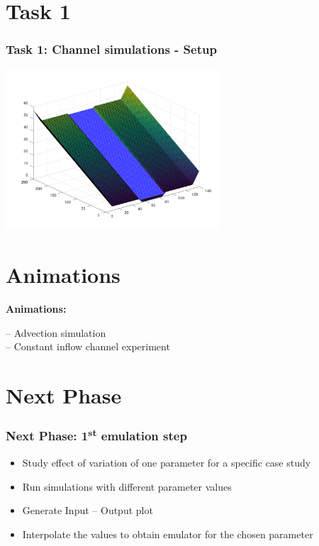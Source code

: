 \documentclass[xcolor=dvipsnames, USenglish]{beamer}  %
\begin{document}

\section{Task 1}

  \begin{frame}
    \frametitle{Task 1: Channel simulations - Setup}
    \centering
    \includegraphics[width=0.6\textwidth]{img/simulation-setup.png}
  \end{frame}


\section{Animations}
  {
    \begin{frame}[plain]
      \centering
      \Large{\textbf{Animations:}}\\
      \begin{flushleft}
        \Large{-- Advection simulation}\\
        \Large{-- Constant inflow channel experiment}
      \end{flushleft}
    \end{frame}
  }


\section{Next Phase}

  \begin{frame}
    \frametitle{Next Phase: 1\textsuperscript{st} emulation step}
    \begin{itemize}
      \item Study effect of variation of one parameter for a specific case study
      \item Run simulations with different parameter values
      \item Generate Input -- Output plot
      \item Interpolate the values to obtain emulator for the chosen parameter
    \end{itemize}
  \end{frame}
\end{document}
